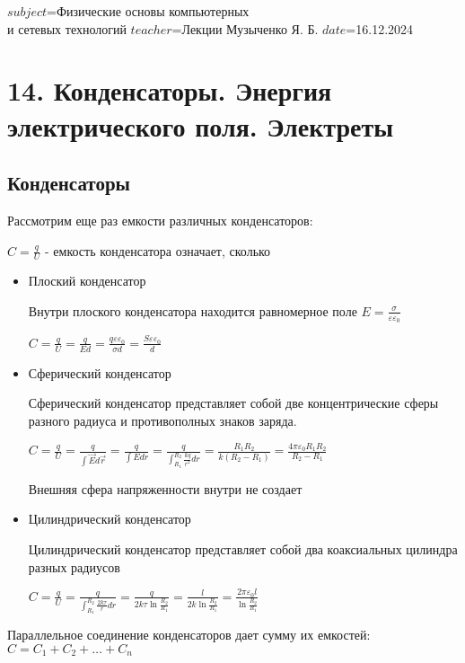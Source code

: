 $subject$=Физические основы компьютерных \\ и сетевых технологий
$teacher$=Лекции Музыченко Я. Б.
$date$=16.12.2024

\section{14. Конденсаторы. Энергия электрического поля. Электреты}

\subsection{Конденсаторы}

Рассмотрим еще раз емкости различных конденсаторов:

$C = \frac{q}{U}$ - емкость конденсатора означает, сколько 

\begin{itemize}
    \item Плоский конденсатор

    Внутри плоского конденсатора находится равномерное поле $E = \frac{\sigma}{\varepsilon\varepsilon_0}$

    $C = \frac{q}{U} = \frac{q}{Ed} = \frac{q \varepsilon \varepsilon_0}{\sigma d} = \frac{S \varepsilon \varepsilon_0}{d}$

    \item Сферический конденсатор

    Сферический конденсатор представляет собой две концентрические сферы разного радиуса и противополных знаков заряда.

    $C = \frac{q}{U} = \frac{q}{\int \vec{E}d\vec{r}} = \frac{q}{\int Edr} = \frac{q}{\int_{R_1}^{R_2} \frac{kq}{r^2} dr} = \frac{R_1 R_2}{k(R_2 - R_1)} = \frac{4\pi \varepsilon_0 R_1 R_2}{R_2 - R_1}$

    Внешняя сфера напряженности внутри не создает

    \item Цилиндрический конденсатор

    Цилиндрический конденсатор представляет собой два коаксиальных цилиндра разных радиусов

    $C = \frac{q}{U} = \frac{q}{\int_{R_1}^{R_2} \frac{2k\tau}{r} dr} = \frac{q}{2k\tau \ln\frac{R_2}{R_1}} = \frac{l}{2k\ln\frac{R_2}{R_1}} = \frac{2\pi \varepsilon_0 l}{\ln \frac{R_2}{R_1}}$

\end{itemize}

Параллельное соединение конденсаторов дает сумму их емкостей: $C = C_1 + C_2 + \dots + C_n$

